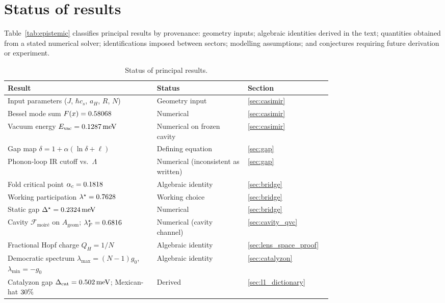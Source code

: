 \documentclass[11pt,letterpaper]{article}
\begin{document}
\appendix

\section{Status of results}
\label{app:status}

Table~\ref{tab:epistemic} classifies principal results by provenance: geometry inputs; algebraic identities derived in the text; quantities obtained from a stated numerical solver; identifications imposed between sectors; modelling assumptions; and conjectures requiring future derivation or experiment.

\begin{table}[htbp]
\centering
\caption{Status of principal results.}
\small
\begin{tabular}{p{0.46\linewidth}p{0.28\linewidth}l}
\hline
\textbf{Result} & \textbf{Status} & \textbf{Section} \\
\hline
Input parameters ($J$, $\hbar c_s$, $a_H$, $R$, $N$) & Geometry input & \ref{sec:casimir} \\
Bessel mode sum $F(x)=0.58068$ & Numerical & \ref{sec:casimir} \\
Vacuum energy $E_{\mathrm{vac}}=0.1287\,\mathrm{meV}$ & Numerical on frozen cavity & \ref{sec:casimir} \\
Gap map $\delta=1+\alpha(\ln\delta+\ell)$ & Defining equation & \ref{sec:gap} \\
Phonon-loop IR cutoff vs.\ $\Lambda$ & Numerical (inconsistent as written) & \ref{sec:gap} \\
Fold critical point $\alpha_c=0.1818$ & Algebraic identity & \ref{sec:bridge} \\
Working participation $\lambda^\star=0.7628$ & Working choice & \ref{sec:bridge} \\
Static gap $\Delta^\star=0.2324\,\mathrm{meV}$ & Numerical & \ref{sec:bridge} \\
Cavity $\mathcal{F}_{\text{moir\'{e}}}$ on $A_{\mathrm{geom}}$; $\lambda^\star_F=0.6816$ & Numerical (cavity channel) & \ref{sec:cavity_qvc} \\
Fractional Hopf charge $Q_H=1/N$ & Algebraic identity & \ref{sec:lens_space_proof} \\
Democratic spectrum $\lambda_{\max}=(N-1)g_0$, $\lambda_{\min}=-g_0$ & Algebraic identity & \ref{sec:catalyzon} \\
Catalyzon gap $\Delta_{\mathrm{cat}}=0.502\,\mathrm{meV}$; Mexican-hat $30\%$ & Derived & \ref{sec:l1_dictionary} \\

\end{tabular}
\end{table}
\end{document}
